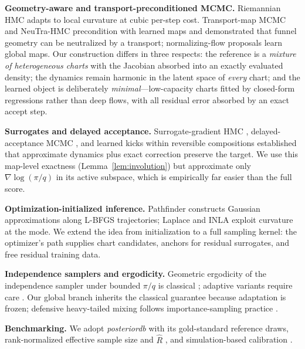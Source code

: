 \documentclass[10pt,journal,compsoc]{IEEEtran}
\begin{document}
\textbf{Geometry-aware and transport-preconditioned MCMC.} Riemannian HMC
\cite{girolami2011} adapts to local curvature at cubic per-step cost.
Transport-map MCMC \cite{parno2018,marzouk2016} and NeuTra-HMC
\cite{hoffman2019} precondition with learned maps and demonstrated that
funnel geometry can be neutralized by a transport; normalizing-flow
proposals \cite{albergo2019,gabrie2022} learn global maps. Our construction
differs in three respects: the reference is a \emph{mixture of heterogeneous
charts} with the Jacobian absorbed into an exactly evaluated density; the
dynamics remain harmonic in the latent space of \emph{every} chart; and the
learned object is deliberately \emph{minimal}---low-capacity charts fitted
by closed-form regressions rather than deep flows, with all residual error
absorbed by an exact accept step.

\textbf{Surrogates and delayed acceptance.} Surrogate-gradient HMC
\cite{rasmussen2003,strathmann2015,zhang2017}, delayed-acceptance MCMC
\cite{christen2005,sherlock2017}, and learned kicks within reversible
compositions \cite{neklyudov2020,levy2018,song2017} established that
approximate dynamics plus exact correction preserve the target. We use this
map-level exactness (Lemma~\ref{lem:involution}) but approximate only
$\nabla\log(\pi/q)$ in its active subspace, which is empirically far easier
than the full score.

\textbf{Optimization-initialized inference.} Pathfinder \cite{zhang2022}
constructs Gaussian approximations along L-BFGS \cite{liu1989} trajectories;
Laplace and INLA \cite{rue2009} exploit curvature at the mode. We extend the
idea from initialization to a full sampling kernel: the optimizer's path
supplies chart candidates, anchors for residual surrogates, and free
residual training data.

\textbf{Independence samplers and ergodicity.} Geometric ergodicity of the
independence sampler under bounded $\pi/q$ is classical
\cite{mengersen1996,tierney1994,roberts2004}; adaptive variants require care
\cite{andrieu2008,roberts2007}. Our global branch inherits the classical
guarantee because adaptation is frozen; defensive heavy-tailed mixing
follows importance-sampling practice \cite{hesterberg1995,owen2000}.

\textbf{Benchmarking.} We adopt \emph{posteriordb} \cite{magnusson2024} with
its gold-standard reference draws, rank-normalized effective sample size and
$\widehat R$ \cite{vehtari2021}, and simulation-based calibration
\cite{talts2018}.
\end{document}
